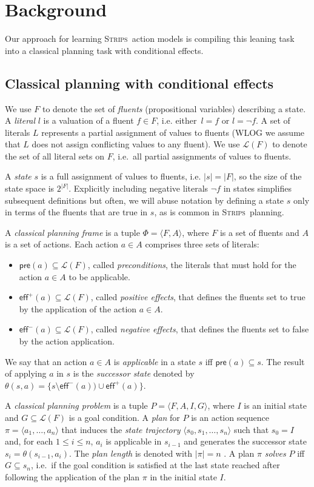 \documentclass{article}
\newcommand{\tup}[1]{{\langle #1 \rangle}}
\newcommand{\pre}{\mathsf{pre}}     %
\newcommand{\eff}{\mathsf{eff}}     %
\newcommand{\strips}{\textsc{Strips}}     %
\begin{document}
\section{Background}
Our approach for learning \strips\ action models is compiling this leaning task into a classical planning task with conditional effects.

\subsection{Classical planning with conditional effects}
We use $F$ to denote the set of {\em fluents} (propositional variables) describing a state. A {\em literal} $l$ is a valuation of a fluent $f\in F$, i.e. either~$l=f$ or $l=\neg f$. A set of literals $L$ represents a partial assignment of values to fluents (WLOG we assume that $L$ does not assign conflicting values to any fluent). We use $\mathcal{L}(F)$ to denote the set of all literal sets on $F$, i.e.~all partial assignments of values to fluents.

A {\em state} $s$ is a full assignment of values to fluents, i.e. $|s|=|F|$, so the size of the state space is $2^{|F|}$. Explicitly including negative literals $\neg f$ in states simplifies subsequent definitions but often, we will abuse notation by defining a state $s$ only in terms of the fluents that are true in $s$, as is common in \strips\ planning.

A {\em classical planning frame} is a tuple $\Phi=\tup{F,A}$, where $F$ is a set of fluents and $A$ is a set of actions. Each action $a\in A$ comprises three sets of literals:
\begin{itemize}
\item $\pre(a)\subseteq\mathcal{L}(F)$, called {\em preconditions}, the literals that must hold for the action $a\in A$ to be applicable.
\item $\eff^+(a)\subseteq\mathcal{L}(F)$, called {\em positive effects}, that defines the fluents set to true by the application of the action $a\in A$.
\item $\eff^-(a)\subseteq\mathcal{L}(F)$, called {\em negative effects}, that defines the fluents set to false by the action application.
\end{itemize}
We say that an action $a\in A$ is {\em applicable} in a state $s$ iff $\pre(a)\subseteq s$. The result of applying $a$ in $s$ is the {\em successor state} denoted by $\theta(s,a)=\{s\setminus\eff^-(a))\cup\eff^+(a)\}$.

A {\em classical planning problem} is a tuple $P=\tup{F,A,I,G}$, where $I$ is an initial state and $G\subseteq\mathcal{L}(F)$ is a goal condition. A {\em plan} for $P$ is an action sequence $\pi=\tup{a_1, \ldots, a_n}$ that induces the {\em state trajectory} $\tup{s_0, s_1, \ldots, s_n}$ such that $s_0=I$ and, for each {\small $1\leq i\leq n$}, $a_i$ is applicable in $s_{i-1}$ and generates the successor state $s_i=\theta(s_{i-1},a_i)$. The {\em plan length} is denoted with $|\pi|=n$ . A plan $\pi$ {\em solves} $P$ iff $G\subseteq s_n$, i.e.~if the goal condition is satisfied at the last state reached after following the application of the plan $\pi$ in the initial state $I$.
\end{document}

